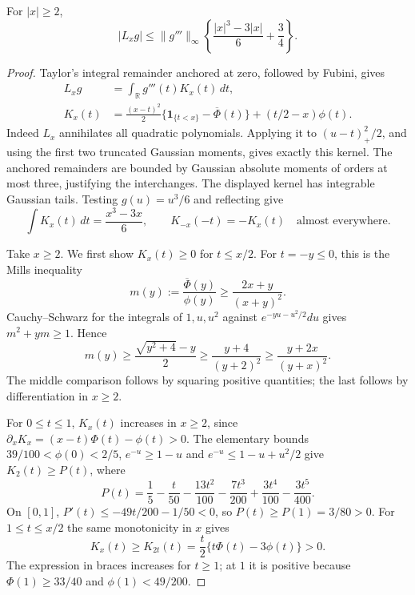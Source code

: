 \begin{lemma}\label{gc:kernel}
For $|x|\ge2$,
\begin{equation}\label{gc:kernel-bound}
 |L_xg|\le\|g'''\|_\infty
       \left\{\frac{|x|^3-3|x|}{6}+\frac34\right\}.
\end{equation}
\end{lemma}
\begin{proof}
Taylor's integral remainder anchored at zero, followed by Fubini, gives
\begin{equation}\label{gc:peano}
 \begin{aligned}
 L_xg&=\int_{\mathbb R}g'''(t)K_x(t)\,dt,\\
 K_x(t)&=\frac{(x-t)^2}{2}
       \{\mathbf1_{\{t<x\}}-\overline\Phi(t)\}+(t/2-x)\phi(t).
 \end{aligned}
\end{equation}
Indeed $L_x$ annihilates all quadratic polynomials. Applying it to
$(u-t)_+^2/2$, and using the first two truncated Gaussian moments,
gives exactly this kernel. The anchored remainders are bounded by
Gaussian absolute moments of orders at most three, justifying the
interchanges. The displayed kernel has integrable Gaussian tails.
Testing $g(u)=u^3/6$ and reflecting give
\[
 \int K_x(t)\,dt=\frac{x^3-3x}{6},\qquad
 K_{-x}(-t)=-K_x(t)\quad\text{almost everywhere}.
\]

Take $x\ge2$. We first show $K_x(t)\ge0$ for $t\le x/2$.
For $t=-y\le0$, this is the Mills inequality
\[
 m(y):=\frac{\overline\Phi(y)}{\phi(y)}
 \ge\frac{2x+y}{(x+y)^2}.
\]
Cauchy--Schwarz for the integrals of $1,u,u^2$ against
$e^{-yu-u^2/2}du$ gives $m^2+ym\ge1$. Hence
\[
 m(y)\ge\frac{\sqrt{y^2+4}-y}{2}
       \ge\frac{y+4}{(y+2)^2}
       \ge\frac{y+2x}{(y+x)^2}.
\]
The middle comparison follows by squaring positive quantities; the
last follows by differentiation in $x\ge2$.

For $0\le t\le1$, $K_x(t)$ increases in $x\ge2$, since
$\partial_xK_x=(x-t)\Phi(t)-\phi(t)>0$. The elementary bounds
$39/100<\phi(0)<2/5$, $e^{-u}\ge1-u$ and
$e^{-u}\le1-u+u^2/2$ give $K_2(t)\ge P(t)$, where
\[
 P(t)=\frac15-\frac t{50}-\frac{13t^2}{100}
       -\frac{7t^3}{200}+\frac{3t^4}{100}-\frac{3t^5}{400}.
\]
On $[0,1]$, $P'(t)\le-49t/200-1/50<0$, so
$P(t)\ge P(1)=3/80>0$.
For $1\le t\le x/2$ the same monotonicity in $x$ gives
\[
 K_x(t)\ge K_{2t}(t)
       =\frac t2\{t\Phi(t)-3\phi(t)\}>0.
\]
The expression in braces increases for $t\ge1$; at $1$ it is
positive because $\Phi(1)\ge33/40$ and $\phi(1)<49/200$.


\end{proof}
